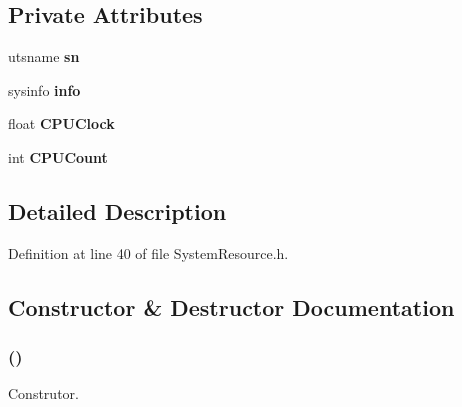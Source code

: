 \subsection*{Private Attributes}
\begin{CompactItemize}
\item 
utsname {\bf sn}\label{classbr_1_1ufscar_1_1lince_1_1ginga_1_1recommender_1_1SystemResource_9b402aad1b8c08bb3a3421b128c63cf8}

\item 
sysinfo {\bf info}\label{classbr_1_1ufscar_1_1lince_1_1ginga_1_1recommender_1_1SystemResource_1c6b3fa2f7897150767f8544aebb40a9}

\item 
float {\bf CPUClock}\label{classbr_1_1ufscar_1_1lince_1_1ginga_1_1recommender_1_1SystemResource_7599990061c2e531c7ee1b2851c293d8}

\item 
int {\bf CPUCount}\label{classbr_1_1ufscar_1_1lince_1_1ginga_1_1recommender_1_1SystemResource_fc2b2eac726745e2f2e515138b4d5c6c}

\end{CompactItemize}


\subsection{Detailed Description}




Definition at line 40 of file SystemResource.h.

\subsection{Constructor \& Destructor Documentation}
\subsubsection{ ()}\label{classbr_1_1ufscar_1_1lince_1_1ginga_1_1recommender_1_1SystemResource_08e49876c23d2b87c1743b43ee9f18fb}


Construtor. 
